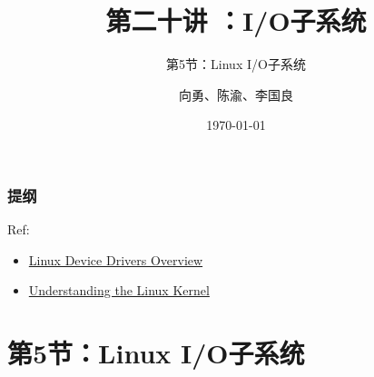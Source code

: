 


\title[第20讲]{第二十讲 ：I/O子系统} %
\subtitle{第5节：Linux I/O子系统}
\author{向勇、陈渝、李国良} %
\date{\today} %



\begin{frame}
\titlepage %
\end{frame}

\begin{frame}
\frametitle{提纲} %
\tableofcontents %

Ref:
    \begin{itemize}
        \item \href{http://osq.cs.berkeley.edu/public/JFoster-Drivers.ppt}{Linux Device Drivers Overview}
        \item \href{http://ermak.cs.nstu.ru/understanding.linux.kernel.pdf}{Understanding the Linux Kernel}
    \end{itemize}

\end{frame}
\section{第5节：Linux I/O子系统} %
